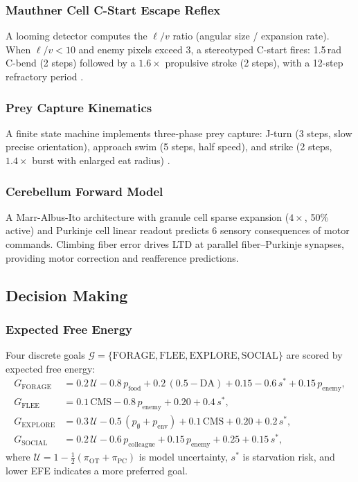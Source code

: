 \documentclass[12pt]{article}
\begin{document}
\subsubsection{Mauthner Cell C-Start Escape Reflex}

A looming detector computes the $\ell/v$ ratio (angular size /
expansion rate).
When $\ell/v < 10$ and enemy pixels exceed 3, a stereotyped C-start
fires: 1.5\,rad C-bend (2 steps) followed by a $1.6\times$
propulsive stroke (2 steps), with a 12-step refractory period
\citep{temizer2015}.

\subsubsection{Prey Capture Kinematics}

A finite state machine implements three-phase prey capture:
J-turn (3 steps, slow precise orientation), approach swim
(5 steps, half speed), and strike (2 steps, $1.4\times$ burst
with enlarged eat radius) \citep{bianco2015}.

\subsubsection{Cerebellum Forward Model}

A Marr-Albus-Ito architecture with granule cell sparse expansion
($4\times$, 50\% active) and Purkinje cell linear readout predicts
6 sensory consequences of motor commands.
Climbing fiber error drives LTD at parallel fiber--Purkinje synapses,
providing motor correction and reafference predictions.

\subsection{Decision Making}\label{sec:decision}

\subsubsection{Expected Free Energy}

Four discrete goals $\mathcal{G} = \{\text{FORAGE}, \text{FLEE},
\text{EXPLORE}, \text{SOCIAL}\}$ are scored by expected free energy:
\begin{equation}\label{eq:efe}
\begin{aligned}
  G_\text{FORAGE} &= 0.2\,\mathcal{U} - 0.8\,p_\text{food}
    + 0.2\,(0.5 - \text{DA}) + 0.15
    - 0.6\,s^* + 0.15\,p_\text{enemy}, \\
  G_\text{FLEE} &= 0.1\,\text{CMS} - 0.8\,p_\text{enemy} + 0.20
    + 0.4\,s^*, \\
  G_\text{EXPLORE} &= 0.3\,\mathcal{U}
    - 0.5\,(p_\emptyset + p_\text{env})
    + 0.1\,\text{CMS} + 0.20 + 0.2\,s^*, \\
  G_\text{SOCIAL} &= 0.2\,\mathcal{U}
    - 0.6\,p_\text{colleague}
    + 0.15\,p_\text{enemy} + 0.25 + 0.15\,s^*,
\end{aligned}
\end{equation}
where $\mathcal{U} = 1 - \frac{1}{2}(\pi_\text{OT} + \pi_\text{PC})$
is model uncertainty, $s^*$ is starvation risk, and lower EFE
indicates a more preferred goal.
\end{document}
